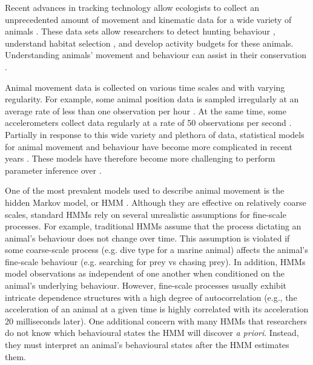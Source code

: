 


Recent advances in tracking technology allow ecologists to collect an unprecedented amount of movement and kinematic data for a wide variety of animals \citep{Patterson:2017}. These data sets allow researchers to detect hunting behaviour \citep{Heerah:2017}, understand habitat selection \citep{Michelot:2019b}, and develop activity budgets \citep{Dot:2016} for these animals. Understanding animals' movement and behaviour can assist in their conservation \citep{Sutherland:1998} \citep{Ogburn:2017}.

Animal movement data is collected on various time scales and with varying regularity. For example, some animal position data is sampled irregularly at an average rate of less than one observation per hour \citep{Gryba:2019}. At the same time, some accelerometers collect data regularly at a rate of 50 observations per second \citep{Daneault:2021}. Partially in response to this wide variety and plethora of data, statistical models for animal movement and behaviour have become more complicated in recent years \citep{Hooten:2017}. These models have therefore become more challenging to perform parameter inference over \citep{McClintock:2012, Michelot:2019b}.

One of the most prevalent models used to describe animal movement is the hidden Markov model, or HMM \citep{McClintock:2020}. Although they are effective on relatively coarse scales, standard HMMs rely on several unrealistic assumptions for fine-scale processes. For example, traditional HMMs assume that the process dictating an animal’s behaviour does not change over time. This assumption is violated if some coarse-scale process (e.g. dive type for a marine animal) affects the animal's fine-scale behaviour (e.g. searching for prey vs chasing prey). In addition, HMMs model observations as independent of one another when conditioned on the animal's underlying behaviour. However, fine-scale processes usually exhibit intricate dependence structures with a high degree of autocorrelation (e.g., the acceleration of an animal at a given time is highly correlated with its acceleration 20 milliseconds later). One additional concern with many HMMs that researchers do not know which behavioural states the HMM will discover \textit{a priori}. Instead, they must interpret an animal's behavioural states after the HMM estimates them.

